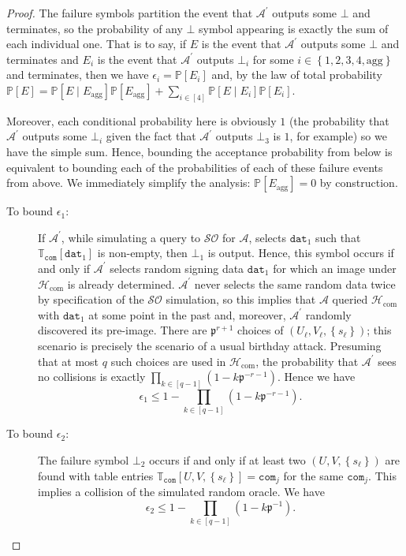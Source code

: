 \documentclass{mrl}
\theoremstyle{definition}
\numberwithin{theorem}{subsection}
\newcommand{\adversary}{\mathcal{A}}
\newcommand{\p}{\mathfrak{p}}
\begin{document}
\begin{proof}

The failure symbols partition the event that $\adversary^\prime$ outputs some $\bot$ and terminates, so the probability of any $\bot$ symbol appearing is exactly the sum of each individual one. That is to say, if $E$ is the event that $\adversary^\prime$ outputs some $\bot$ and terminates and $E_i$ is the event that $\adversary^\prime$ outputs  $\bot_i$ for some $ i \in \left\{1,2,3,4,\text{agg}\right\}$ and terminates, then we have $\epsilon_i = \mathbb{P}[E_i]$ and, by the law of total probability $\mathbb{P}[E] = \mathbb{P}[E \mid E_{\text{agg}}]\mathbb{P}[E_{\text{agg}}] + \sum_{i \in [4]} \mathbb{P}[E \mid E_i]\mathbb{P}[E_i]$.

Moreover, each conditional probability here is obviously $1$ (the probability that $\adversary^\prime$ outputs some $\bot_i$ given the fact that $\adversary^\prime$ outputs $\bot_3$ is $1$, for example) so we have the simple sum. Hence, bounding the acceptance probability from below is equivalent to bounding each of the probabilities of each of these failure events from above. We immediately simplify the analysis: $\mathbb{P}[E_{\text{agg}}] = 0$ by construction. %
\begin{description}
\item [To bound $\epsilon_1$:] If $\adversary^\prime$, while simulating a query to $\mathcal{SO}$ for $\adversary$, selects $\texttt{dat}_1$ such that $\mathbb{T}_{\texttt{com}}[\texttt{dat}_1]$ is non-empty, then $\bot_1$ is output. Hence, this symbol occurs if and only if $\adversary^\prime$ selects random signing data $\texttt{dat}_1$ for which an image under $\mathcal{H}_{\text{com}}$ is already determined. $\adversary^\prime$ never selects the same random data twice by specification of the $\mathcal{SO}$ simulation, so this implies that $\adversary$ queried $\mathcal{H}_{\text{com}}$ with $\texttt{dat}_1$ at some point in the past and, moreover, $\adversary^\prime$ randomly discovered its pre-image. There are $\p^{r+1}$ choices of $(U_\ell, V_\ell, \left\{s_\ell\right\})$; this scenario is precisely the scenario of a usual birthday attack. Presuming that at most $q$ such choices are used in $\mathcal{H}_{\text{com}}$, the probability that $\adversary^\prime$ sees no collisions is exactly $\prod_{k \in [q-1]}(1 - k\mathfrak{p}^{-r-1})$. Hence we have
\[\epsilon_1 \leq 1 - \prod_{k \in [q-1]}(1 - k\mathfrak{p}^{-r-1}).\]

\item [To bound $\epsilon_2$:] The failure symbol $\bot_2$ occurs if and only if at least two $(U, V, \left\{s_\ell\right\})$ are found with table entries $\mathbb{T}_{\texttt{com}}[U,V,\left\{s_\ell\right\}] = \texttt{com}_j$ for the same $\texttt{com}_j$. This implies a collision of the simulated random oracle. We have
\[\epsilon_2 \leq 1 - \prod_{k \in [q-1]} (1-k\mathfrak{p}^{-1}).\]


\end{description}
\end{proof}
\end{document}
